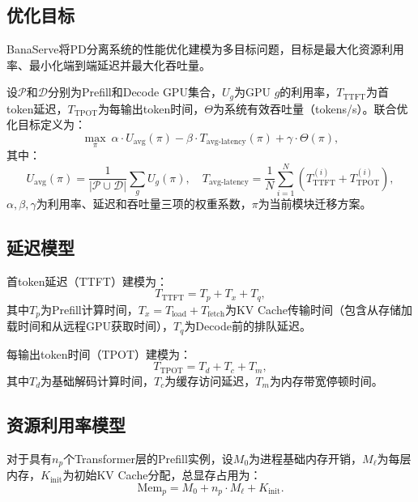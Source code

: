 \subsection{优化目标}

BanaServe将PD分离系统的性能优化建模为多目标问题，目标是最大化资源利用率、最小化端到端延迟并最大化吞吐量。

设$\mathcal{P}$和$\mathcal{D}$分别为Prefill和Decode GPU集合，$U_g$为GPU $g$的利用率，$T_{\text{TTFT}}$为首token延迟，$T_{\text{TPOT}}$为每输出token时间，$\Theta$为系统有效吞吐量（tokens/s）。联合优化目标定义为：
\begin{equation}
    \max_\pi\ \alpha \cdot U_{\text{avg}}(\pi) - \beta \cdot T_{\text{avg-latency}}(\pi) + \gamma \cdot \Theta(\pi),
    \label{eq:joint_objective}
\end{equation}
其中：
\begin{equation}
    U_{\text{avg}}(\pi) = \frac{1}{|\mathcal{P} \cup \mathcal{D}|} \sum_g U_g(\pi), \quad
    T_{\text{avg-latency}} = \frac{1}{N} \sum_{i=1}^{N} \left(T^{(i)}_{\text{TTFT}} + T^{(i)}_{\text{TPOT}}\right),
    \label{eq:utilization_latency}
\end{equation}
$\alpha, \beta, \gamma$为利用率、延迟和吞吐量三项的权重系数，$\pi$为当前模块迁移方案。

\subsection{延迟模型}

首token延迟（TTFT）建模为：
\begin{equation}
    T_{\text{TTFT}} = T_p + T_x + T_q,
    \label{eq:ttft_model}
\end{equation}
其中$T_p$为Prefill计算时间，$T_x = T_{\text{load}} + T_{\text{fetch}}$为KV Cache传输时间（包含从存储加载时间和从远程GPU获取时间），$T_q$为Decode前的排队延迟。

每输出token时间（TPOT）建模为：
\begin{equation}
    T_{\text{TPOT}} = T_d + T_c + T_m,
    \label{eq:tpot_model}
\end{equation}
其中$T_d$为基础解码计算时间，$T_c$为缓存访问延迟，$T_m$为内存带宽停顿时间。

\subsection{资源利用率模型}

对于具有$n_p$个Transformer层的Prefill实例，设$M_0$为进程基础内存开销，$M_\ell$为每层内存，$K_{\text{init}}$为初始KV Cache分配，总显存占用为：
\begin{equation}
    \text{Mem}_p = M_0 + n_p \cdot M_\ell + K_{\text{init}}.
    \label{eq:prefill_mem}
\end{equation}

